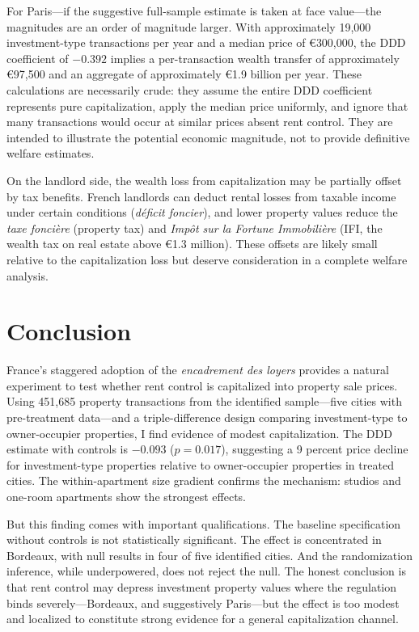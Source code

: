 \documentclass[12pt]{article}
\begin{document}
For Paris---if the suggestive full-sample estimate is taken at face value---the magnitudes are an order of magnitude larger. With approximately 19,000 investment-type transactions per year and a median price of \euro{300,000}, the DDD coefficient of $-0.392$ implies a per-transaction wealth transfer of approximately \euro{97,500} and an aggregate of approximately \euro{1.9} billion per year. These calculations are necessarily crude: they assume the entire DDD coefficient represents pure capitalization, apply the median price uniformly, and ignore that many transactions would occur at similar prices absent rent control. They are intended to illustrate the potential economic magnitude, not to provide definitive welfare estimates.

On the landlord side, the wealth loss from capitalization may be partially offset by tax benefits. French landlords can deduct rental losses from taxable income under certain conditions (\emph{d\'eficit foncier}), and lower property values reduce the \emph{taxe fonci\`ere} (property tax) and \emph{Imp\^ot sur la Fortune Immobili\`ere} (IFI, the wealth tax on real estate above \euro{1.3} million). These offsets are likely small relative to the capitalization loss but deserve consideration in a complete welfare analysis.


\section{Conclusion}

France's staggered adoption of the \emph{encadrement des loyers} provides a natural experiment to test whether rent control is capitalized into property sale prices. Using 451,685 property transactions from the identified sample---five cities with pre-treatment data---and a triple-difference design comparing investment-type to owner-occupier properties, I find evidence of modest capitalization. The DDD estimate with controls is $-0.093$ ($p = 0.017$), suggesting a 9 percent price decline for investment-type properties relative to owner-occupier properties in treated cities. The within-apartment size gradient confirms the mechanism: studios and one-room apartments show the strongest effects.

But this finding comes with important qualifications. The baseline specification without controls is not statistically significant. The effect is concentrated in Bordeaux, with null results in four of five identified cities. And the randomization inference, while underpowered, does not reject the null. The honest conclusion is that rent control may depress investment property values where the regulation binds severely---Bordeaux, and suggestively Paris---but the effect is too modest and localized to constitute strong evidence for a general capitalization channel.
\end{document}
